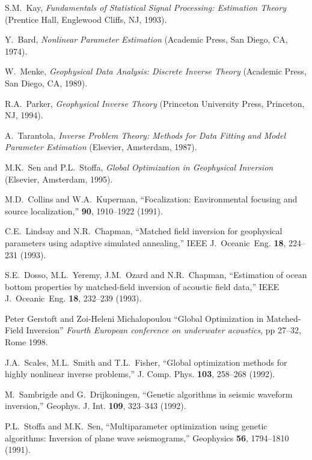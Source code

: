 \documentclass{saclantc}
\begin{document}
\begin{thebibliography}{11}
S.M.\ Kay, {\it Fundamentals of Statistical Signal Processing: Estimation Theory}
(Prentice Hall, Englewood Cliffs, NJ, 1993).

  Y.\ Bard, {\it Nonlinear Parameter Estimation}
(Academic Press, San Diego, CA, 1974).

  W.\ Menke, {\it Geophysical Data Analysis: Discrete Inverse 
Theory} (Academic Press, San Diego, CA, 1989).

 R.A.\ Parker, 
{\it Geophysical Inverse
Theory} (Princeton University Press, Princeton, NJ, 1994).

A.~Tarantola,
{\em Inverse Problem Theory: Methods for Data Fitting and Model
  Parameter Estimation} (Elsevier, Amsterdam, 1987).

M.K.\ Sen and P.L.\ Stoffa, {\it Global Optimization in Geophysical
Inversion} (Elsevier, Amsterdam, 1995).

M.D.\ Collins and W.A.\ Kuperman,
\newblock ``Focalization: Environmental focusing and source localization,''
 {\bf 90}, 1910--1922 (1991).

C.E.~Lindsay and N.R.~Chapman,
``Matched field inversion for geophysical parameters using 
adaptive simulated annealing,''
IEEE J.~Oceanic~Eng. {\bf 18}, 224--231 (1993).

S.E.~Dosso, M.L.~Yeremy, J.M.~Ozard and N.R.~Chapman,
``Estimation of ocean bottom properties by matched-field 
inversion of acoustic field data,''
IEEE J.~Oceanic~Eng. {\bf 18}, 232--239 (1993).

 Peter Gerstoft and Zoi-Heleni Michalopoulou
``Global Optimization in Matched-Field Inversion''
{\it Fourth European conference on underwater acoustics}, pp 27--32, Rome 1998.

J.A.\ Scales, M.L.\ Smith and T.L.\ Fisher,
``Global optimization methods for highly nonlinear inverse problems,''
{J. Comp. Phys.} {\bf 103}, 258--268 (1992).

M.~Sambrigde and G.~Drijkoningen,
``Genetic algorithms in seismic waveform inversion,''
{ Geophys. J. Int.} {\bf 109}, 323--343 (1992).

P.L.\ Stoffa and M.K.\ Sen,
``Multiparameter optimization using genetic algorithms:
  Inversion of plane wave seismograms,''
{ Geophysics} {\bf 56}, 1794--1810 (1991).


\end{thebibliography}
\end{document}
